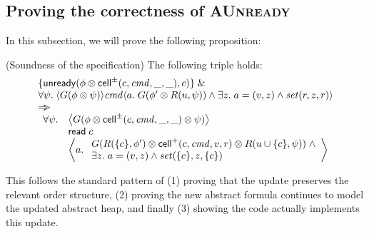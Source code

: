 \subsection{Proving the correctness of \textsc{AUnready}}

In this subsection, we will prove the following proposition:

\begin{prop*}{(Soundness of the  specification)}
The following triple holds:
\begin{displaymath}
\begin{array}{l}
\{{\mathsf{unready}({\phi \otimes \mathsf{cell}^{\pm}({c}, {\mathit{cmd}}, {\_}, {\_})}, {c})}\} \;\&\; \\
\forall \psi.\; \langle{G(\phi \otimes \psi)}\rangle{\mathit{cmd}}\langle{a}.\;{G(\phi' \otimes R(u, \psi)) \land \exists z.\; a = (v, z) \land \mathit{set}(r, z, r)}\rangle \\
\Rightarrow\!\!\!> \\
\begin{array}{ll}
 \forall \psi. & \left<G(\phi \otimes \mathsf{cell}^{\pm}({c}, {\mathit{cmd}}, {\_}, {\_}) \otimes \psi)\right> \\
               & \mathsf{read}\; c \\
               & \left<a.\; 
                   \begin{array}{l}
                     G(R(\{{c}\}, \phi') \otimes \mathsf{cell}^{+}({c}, {\mathit{cmd}}, {v}, {r}) \otimes R(u \cup \{{c}\}, \psi)) 
                      \;\land \\
                      \exists z.\;a = (v, z) \land \mathit{set}(\{{c}\}, z, \{{c}\})
                   \end{array}\right> 
\end{array}
\end{array}
\end{displaymath}
\end{prop*}

This follows the standard pattern of (1) proving that the update
preserves the relevant order structure, (2) proving the new abstract
formula continues to model the updated abstract heap, and finally (3)
showing the code actually implements this update. 



